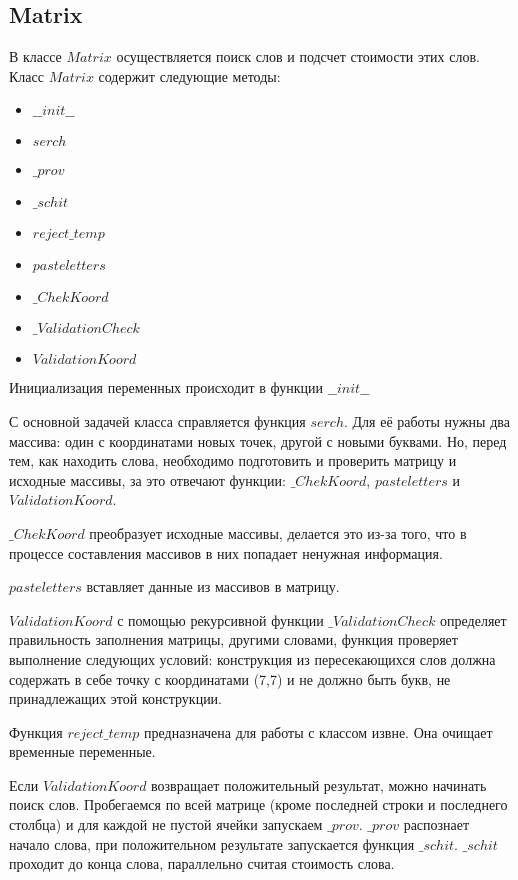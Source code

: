 \documentclass[a4paper,14pt]{article}
\begin{document}
	\subsection{Matrix}
	В классе $Matrix$ осуществляется поиск слов и подсчет стоимости этих слов. Класс $Matrix$ содержит следующие методы: 
	
	\begin {itemize}
		\item$\_\_init\_\_$
		\item $serch$	
		
		\item $\_prov$
		\item $\_schit$
		\item $reject\_temp$
		
		\item $pasteletters$
		\item $\_ChekKoord$
		\item $\_ValidationCheck$	
		\item $ValidationKoord$
	\end {itemize}
	
	Инициализация переменных происходит в функции $\_\_init\_\_$
	
	С основной задачей класса справляется функция $serch$. Для её работы нужны два массива: один с координатами новых точек, другой с новыми буквами. Но, перед тем, как находить слова, необходимо подготовить и проверить матрицу и исходные массивы, за это отвечают функции: $\_ChekKoord$, $pasteletters$ и $ValidationKoord$.
	
	$\_ChekKoord$ преобразует исходные массивы, делается это из-за того, что в процессе составления массивов в них попадает ненужная информация.
	
	$pasteletters$ вставляет данные из массивов в матрицу.
	
	$ValidationKoord$ с помощью рекурсивной функции $\_ValidationCheck$ определяет правильность заполнения матрицы, другими словами, функция проверяет выполнение следующих условий: конструкция из пересекающихся слов должна содержать в себе точку с координатами (7,7) и не должно быть букв, не принадлежащих этой конструкции.
	
	Функция $reject\_temp$ предназначена для работы с классом извне. Она очищает временные переменные.  
	
	Если $ValidationKoord$ возвращает положительный результат, можно начинать поиск слов. Пробегаемся по всей матрице (кроме последней строки и последнего столбца) и для каждой не пустой ячейки запускаем $\_prov$. $\_prov$ распознает начало слова, при положительном результате запускается функция $\_schit$. $\_schit$ проходит до конца слова, параллельно считая стоимость слова.
	
\end{document}
